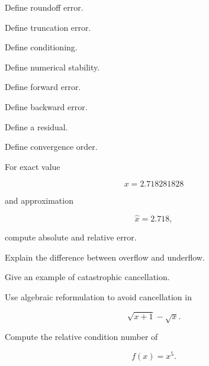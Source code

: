 \begin{exercise}[1]
Define roundoff error.
\end{exercise}

\begin{exercise}[1]
Define truncation error.
\end{exercise}

\begin{exercise}[1]
Define conditioning.
\end{exercise}

\begin{exercise}[1]
Define numerical stability.
\end{exercise}

\begin{exercise}[1]
Define forward error.
\end{exercise}

\begin{exercise}[1]
Define backward error.
\end{exercise}

\begin{exercise}[1]
Define a residual.
\end{exercise}

\begin{exercise}[1]
Define convergence order.
\end{exercise}

\begin{exercise}[2]
For exact value

\[
x=2.718281828
\]

and approximation

\[
\widehat{x}=2.718,
\]

compute absolute and relative error.
\end{exercise}

\begin{exercise}[2]
Explain the difference between overflow and underflow.
\end{exercise}

\begin{exercise}[2]
Give an example of catastrophic cancellation.
\end{exercise}

\begin{exercise}[2]
Use algebraic reformulation to avoid cancellation in

\[
\sqrt{x+1}-\sqrt{x}.
\]
\end{exercise}

\begin{exercise}[2]
Compute the relative condition number of

\[
f(x)=x^5.
\]
\end{exercise}

